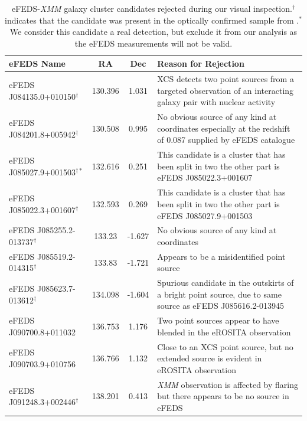 \documentclass[fleqn,usenatbib]{mnras}
\begin{document}
\begin{table}
\begin{center}
\caption[]{{eFEDS-{\em XMM} galaxy cluster candidates rejected during our visual inspection.\newline $^\dagger$ indicates that the candidate was present in the optically confirmed sample from \cite{efedsclusteropticalcat}.\newline $^*$ We consider this candidate a real detection, but exclude it from our analysis as the eFEDS measurements will not be valid.}\label{tab:rejects}}
\vspace{1mm}
\begin{tabular}{lcc|l}
\hline
\hline
eFEDS Name & RA & Dec & Reason for Rejection\\
\hline
\hline
eFEDS J084135.0+010150$^\dagger$ & 130.396 & 1.031 & XCS detects two point sources from a targeted observation of an interacting galaxy pair with nuclear activity \\ 
\hline 
eFEDS J084201.8+005942$^\dagger$ & 130.508 & 0.995 & No obvious source of any kind at coordinates especially at the redshift of 0.087 supplied by eFEDS catalogue \\ 
\hline
eFEDS J085027.9+001503$^{\dagger *}$ & 132.616 & 0.251 & This candidate is a cluster that has been split in two the other part is eFEDS J085022.3+001607\\
\hline
eFEDS J085022.3+001607$^\dagger$ & 132.593 & 0.269 & This candidate is a cluster that has been split in two the other part is eFEDS J085027.9+001503 \\ 
\hline 
eFEDS J085255.2-013737$^\dagger$ & 133.23 & -1.627 & No obvious source of any kind at coordinates \\
\hline 
eFEDS J085519.2-014315$^\dagger$ & 133.83 & -1.721 & Appears to be a misidentified point source \\ 
\hline 
eFEDS J085623.7-013612$^\dagger$ & 134.098 & -1.604 & Spurious candidate in the outskirts of a bright point source, due to same source as eFEDS J085616.2-013945 \\ 
\hline 
eFEDS J090700.8+011032 & 136.753 & 1.176 & Two point sources appear to have blended in the eROSITA observation \\
\hline 
eFEDS J090703.9+010756 & 136.766 & 1.132 & Close to an XCS point source, but no extended source is evident in eROSITA observation \\ 
\hline 
eFEDS J091248.3+002446$^\dagger$ & 138.201 & 0.413 & {\em XMM} observation is affected by flaring but there appears to be no source in eFEDS \\ 

\end{tabular}
\end{center}
\end{table}
\end{document}
